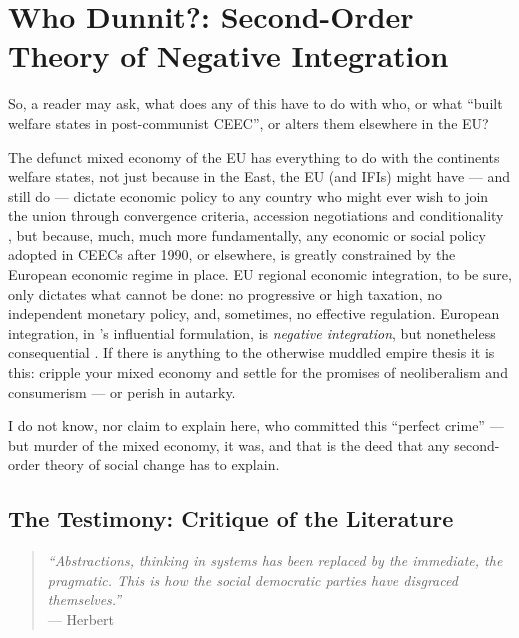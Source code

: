 \documentclass[11pt,a4paper,oneside,openright]{article}
\begin{document}
\section{Who Dunnit?: Second-Order Theory of Negative Integration} \label{sec:who-dunnit}

So, a reader may ask, what does any of this have to do with who, or what  ``built welfare states in post-communist \gls{CEEC}'', or alters them elsewhere in the \gls{EU}? 

The defunct mixed economy of the \gls{EU} has everything to do with the continents welfare states, not just because in the East, the \gls{EU} (and \glspl{IFI}) might have --- and still do --- dictate economic policy to any country who might ever wish to join the union through convergence criteria, accession negotiations and conditionality \citep[55]{Bonker2006}, but because, much, much more fundamentally, any economic or social policy adopted in \glspl{CEEC} after 1990, or elsewhere, is greatly constrained by the European economic regime in place. 
\gls{EU} regional economic integration, to be sure, only dictates what cannot be done: 
no progressive or high taxation, no independent monetary policy, and, sometimes, no effective regulation. 
European integration, in \citeauthor{Scharpf1997}'s influential formulation, is \emph{negative integration}, but nonetheless consequential \citep{Scharpf1997}. 
If there is anything to the otherwise muddled empire thesis \citep{BeckGrande-2007-aa} it is this: 
cripple your mixed economy and settle for the promises of neoliberalism and consumerism --- or perish in autarky.

I do not know, nor claim to explain here, who committed this ``perfect crime'' \citep{Galbraith2002a} --- but murder of the mixed economy, it was, and that is the deed that any second-order theory of social change has to explain.

\subsection[Literature]{The Testimony: Critique of the Literature} \label{sec:Literature}

\begin{quote}
	\emph{``Abstractions, thinking in systems has been replaced by the immediate, the pragmatic. 
	This is how the social democratic parties have disgraced themselves.''}\\
	--- Herbert \cite[41]{Schui2009}
\end{quote}
\end{document}
